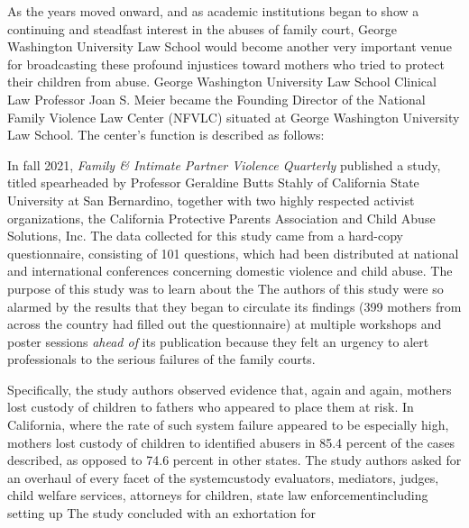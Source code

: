 As the years moved onward, and as academic institutions began
to show a continuing and steadfast interest in the abuses of family court, George Washington University Law School would become
another very important venue for broadcasting these profound injustices toward mothers who tried to protect their children from abuse.
George Washington University Law School Clinical Law Professor
Joan S. Meier became the Founding Director of the National Family
Violence Law Center (NFVLC) situated at George Washington University Law School. 
The center's function is described as follows: \hspace{1pt} \pfl{}

\enlargethispage{1em}%
In fall 2021, \textit{Family \& Intimate Partner Violence Quarterly} published
a study, titled  spearheaded 
by Professor Geraldine Butts Stahly of California State University at
San Bernardino, together with two highly respected activist organizations,
the California Protective Parents Association and Child Abuse Solutions, Inc. 
The data collected for this study came from a hard-copy
questionnaire, consisting of 101 questions, which had been distributed
at national and international conferences concerning domestic violence
and child abuse. The purpose of this study was to learn about the \hspace{1pt}
The authors of this study were so alarmed by the results that they began
to circulate its findings (399 mothers from across the country had filled
out the questionnaire) at multiple workshops and poster sessions \textit{ahead
of} its publication because they felt an urgency to alert professionals to the
serious failures of the family courts. \pfl{}

Specifically, the study authors observed evidence that, again and
again, mothers lost custody of children to fathers who appeared to
place them at risk. In California, where the rate of such system failure
appeared to be especially high, mothers lost custody of children to 
identified abusers in 85.4 percent of the cases described, as opposed to 74.6
percent in other states. The study authors asked for an overhaul of every
facet of the system\mdash{}custody evaluators, mediators, judges, child 
welfare services, attorneys for children, state law enforcement\mdash{}including
setting up  The study
concluded with an exhortation for \hspace{1pt} \pfl{}

